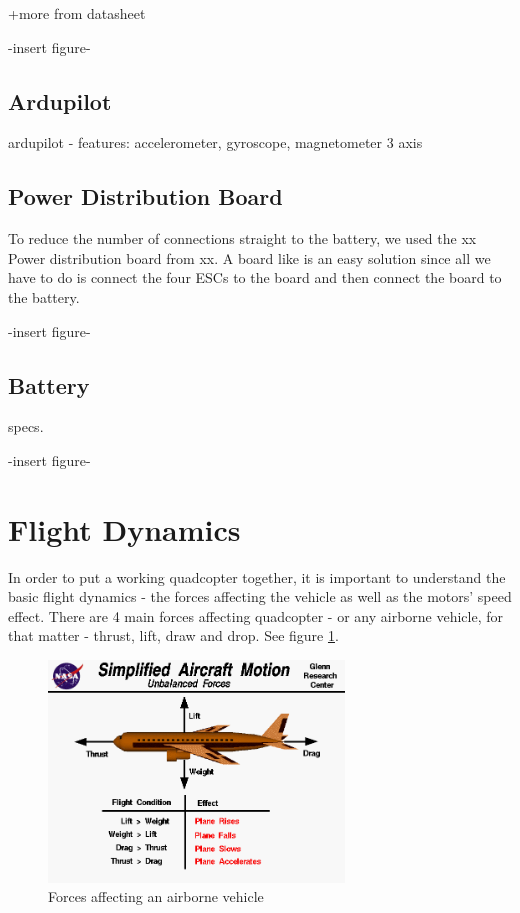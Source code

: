 +more from datasheet

-insert figure-

\subsection{Ardupilot}

ardupilot - features: accelerometer, gyroscope, magnetometer 3 axis

\subsection{Power Distribution Board}
To reduce the number of connections straight to the battery, we used the xx Power distribution board from xx. A board like is an easy solution since all we have to do is connect the four ESCs to the board and then connect the board to the battery.

-insert figure-

\subsection{Battery}
specs.

-insert figure-

\section{Flight Dynamics}

In order to put a working quadcopter together, it is important to understand the basic flight dynamics - the forces affecting the vehicle as well as the motors' speed effect.
There are 4 main forces affecting quadcopter - or any airborne vehicle, for that matter - thrust, lift, draw and drop. See figure \ref{droneForces}.
\begin{figure}[H]
  \centering
    \includegraphics[width=0.7\textwidth]{images/droneForces.png}
	\caption{Forces affecting an airborne vehicle\cite{dForces}}
	\label{droneForces}
\end{figure}

